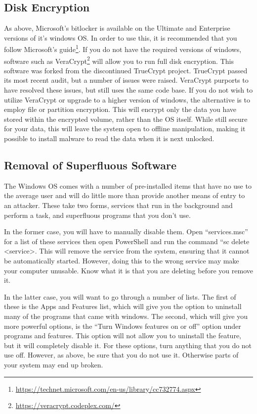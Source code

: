 \documentclass[a4paper,11pt]{report}
\begin{document}
		\subsection{Disk Encryption}
			As above, Microsoft's bitlocker is available on the Ultimate and Enterprise versions of it's windows OS.
			In order to use this, it is recommended that you follow Microsoft's guide\footnote{\url{https://technet.microsoft.com/en-us/library/cc732774.aspx}}. 
			If you do not have the required versions of windows, software such as VeraCrypt\footnote{\url{https://veracrypt.codeplex.com/}} will allow you to run full disk encryption. 
			This software was forked from the discontinued TrueCrypt project. 
			TrueCrypt passed its most recent audit, but a number of issues were raised.
			VeraCrypt purports to have resolved these issues, but still uses the same code base. 
			If you do not wish to utilize VeraCrypt or upgrade to a higher version of windows, the alternative is to employ file or partition encryption. 
			This will encrypt only the data you have stored within the encrypted volume, rather than the OS itself. 
			While still secure for your data, this will leave the system open to offline manipulation,
			making it possible to install malware to read the data when it is next unlocked. 
		\subsection{Removal of Superfluous Software}
			The Windows OS comes with a number of pre-installed items that have no use to the average user and will do little more than provide another means of entry to an attacker. 
			These take two forms, services that run in the background and perform a task, and superfluous programs that you don't use. 

			In the former case, you will have to manually disable them. 
			Open ``services.msc'' for a list of these services then open PowerShell and run the command ``sc delete <service>. 
			This will remove the service from the system, ensuring that it cannot be automatically started. 
			However, doing this to the wrong service may make your computer unusable. 
			Know what it is that you are deleting before you remove it. 

			In the latter case, you will want to go through a number of lists. 
			The first of these is the Apps and Features list, which will give you the option to uninstall many of the programs that came with windows. 
			The second, which will give you more powerful options, is the ``Turn Windows features on or off'' option under programs and features. 
			This option will not allow you to uninstall the feature, but it will completely disable it. 
			For these options, turn anything that you do not use off. 
			However, as above, be sure that you do not use it. 
			Otherwise parts of your system may end up broken. 
\end{document}
